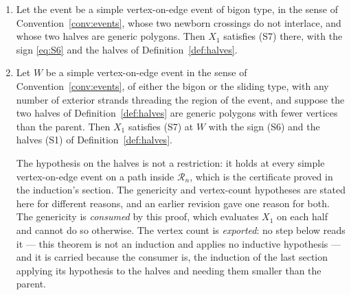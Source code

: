 \begin{theorem}
\begin{enumerate}
\begin{enumerate}
\item[(v)] If $T$ is different-piece, the entire row vanishes:
\[
   N(T)=L(T)=X(T)=Y(T)=0 .
\]
\end{enumerate}
\item[(E)] Let the event be a simple vertex-on-edge event of bigon type, in the sense of
Convention~\ref{conv:events}, whose two newborn crossings do not interlace, and
whose two halves are generic polygons. Then $X_1$ satisfies (S7) there, with the
sign \eqref{eq:S6} and the halves of Definition~\ref{def:halves}.
\item[(F)] Let $W$ be a simple vertex-on-edge event in the sense of
Convention~\ref{conv:events}, of either the bigon or the sliding type, with any
number of exterior strands threading the region of the event, and suppose the
two halves of Definition~\ref{def:halves} are generic polygons with fewer
vertices than the parent. Then $X_1$ satisfies (S7) at $W$ with the sign (S6)
and the halves (S1) of Definition~\ref{def:halves}.

The hypothesis on the halves is not a restriction: it holds at every simple
vertex-on-edge event on a path inside $\mathcal R_n$, which is the certificate
proved in the induction's section. The genericity and vertex-count hypotheses are stated here for different reasons, and an earlier
revision gave one reason for both. The genericity is \emph{consumed} by this
proof, which evaluates $X_1$ on each half and cannot do so otherwise. The
vertex count is \emph{exported}: no step below reads it --- this theorem is not
an induction and applies no inductive hypothesis --- and it is carried because
the consumer is, the induction of the last section applying its hypothesis to
the halves and needing them smaller than the parent.
\end{enumerate}
\end{theorem}

